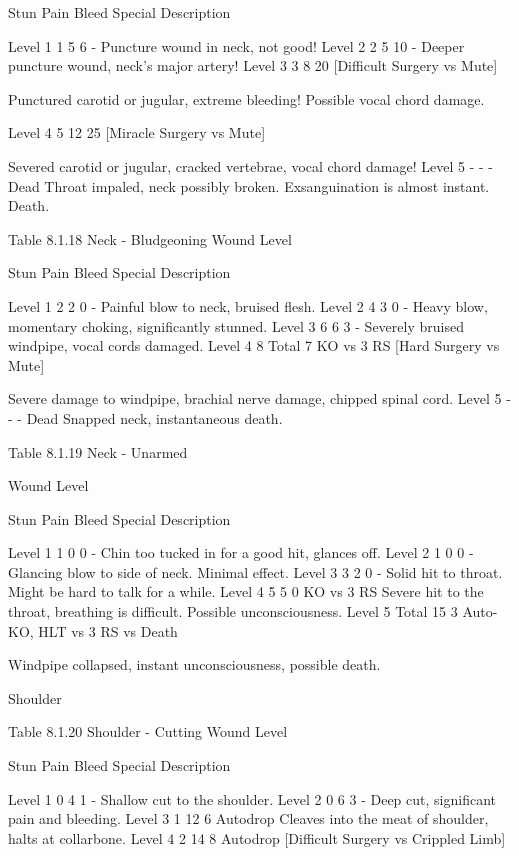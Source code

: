 \documentclass[oneside,11pt,english]{book}
\begin{document}
Stun Pain Bleed Special Description 

Level 1 1 5 6 - Puncture wound in neck, not good! 
Level 2 2 5 10 - Deeper puncture wound, neck’s major artery! 
Level 3 3 8 20 [Difficult Surgery vs 
Mute] 

Punctured carotid or jugular, extreme bleeding! 
Possible vocal chord damage. 

Level 4 5 12 25 [Miracle Surgery vs 
Mute] 

Severed carotid or jugular, cracked vertebrae, vocal 
chord damage! 
Level 5 - - - Dead Throat impaled, neck possibly broken. Exsanguination 
is almost instant. Death. 

 
Table 8.1.18 Neck - Bludgeoning 
Wound 
Level 

Stun Pain Bleed Special Description 

Level 1 2 2 0 - Painful blow to neck, bruised flesh. 
Level 2 4 3 0 - Heavy blow, momentary choking, significantly 
stunned. 
Level 3 6 6 3 - Severely bruised windpipe, vocal cords damaged. 
Level 4 8 Total 7 KO vs 3 RS [Hard 
Surgery vs Mute] 

Severe damage to windpipe, brachial nerve 
damage, chipped spinal cord. 
Level 5 - - - Dead Snapped neck, instantaneous death. 

 
Table 8.1.19 Neck - Unarmed 


Wound 
Level 

Stun Pain Bleed Special Description 

Level 1 1 0 0 - Chin too tucked in for a good hit, glances off. 
Level 2 1 0 0 - Glancing blow to side of neck. Minimal effect. 
Level 3 3 2 0 - Solid hit to throat. Might be hard to talk for a while. 
Level 4 5 5 0 KO vs 3 RS Severe hit to the throat, breathing is difficult. 
Possible unconsciousness. 
Level 5 Total 15 3 Auto-KO, HLT vs 3 RS 
vs Death 

Windpipe collapsed, instant unconsciousness, 
possible death. 

 

 

Shoulder 

 
Table 8.1.20 Shoulder - Cutting 
Wound 
Level 

Stun Pain Bleed Special Description 

Level 1 0 4 1 - Shallow cut to the shoulder. 
Level 2 0 6 3 - Deep cut, significant pain and bleeding. 
Level 3 1 12 6 Autodrop Cleaves into the meat of shoulder, halts at 
collarbone. 
Level 4 2 14 8 Autodrop 
[Difficult Surgery vs 
Crippled Limb] 
\end{document}
